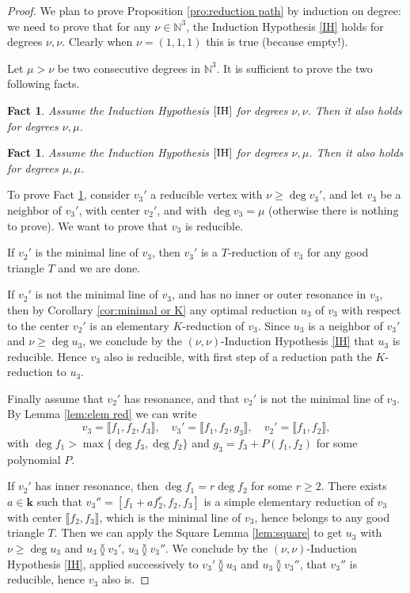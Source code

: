 \documentclass[reqno,oneside,11pt]{amsart}
\theoremstyle{plain}
\newtheorem{fact}[theorem]{Fact}
\theoremstyle{definition}
\newcommand{\N}{\mathbb{N}}
\newcommand{\K}{\mathbf{k}}
\renewcommand{\ne}{\between}
\newcommand{\llb}{\llbracket}
\newcommand{\rrb}{\rrbracket}
\renewcommand{\ge}{\geqslant}
\begin{document}
\begin{proof}
We plan to prove Proposition \ref{pro:reduction path} by induction on degree: we need to prove that for any $\nu \in \N^3$, the Induction Hypothesis \ref{IH} holds for degrees $\nu,\nu$.
Clearly when $\nu =(1,1,1)$ this is true (because empty!).

Let $\mu > \nu$ be two consecutive degrees in $\N^3$.
It is sufficient to prove the two following facts.

\begin{fact} \label{fact:induction 1}
Assume the Induction Hypothesis $\ref{IH}$ for degrees $\nu,\nu$.
Then it also holds for degrees $\nu,\mu$.
\end{fact}

\begin{fact} \label{fact:induction 2}
Assume the Induction Hypothesis $\ref{IH}$ for degrees $\nu,\mu$.
Then it also holds for degrees $\mu,\mu$.
\end{fact}

To prove Fact \ref{fact:induction 1}, consider $v_3'$ a reducible vertex with $\nu \ge \deg v_3'$, and let $v_3$ be a neighbor of $v_3'$, with center $v_2'$, and with $\deg v_3 = \mu$ (otherwise there is nothing to prove).
We want to prove that $v_3$ is reducible.

If $v_2'$ is the minimal line of $v_3$, then $v_3'$ is a $T$-reduction of $v_3$ for any good triangle $T$ and we are done.

If $v_2'$ is not the minimal line of $v_3$, and has no inner or outer resonance in $v_3$, then by Corollary \ref{cor:minimal or K} any optimal reduction $u_3$ of $v_3$ with respect to the center $v_2'$ is an elementary $K$-reduction of $v_3$.
Since $u_3$ is a neighbor of $v_3'$ and $\nu \ge \deg u_3$, we conclude by the $(\nu,\nu)$-Induction Hypothesis \ref{IH} that $u_3$ is reducible.
Hence $v_3$ also is reducible, with first step of a reduction path the $K$-reduction to $u_3$.

Finally assume that $v_2'$ has resonance, and that $v_2'$ is not the minimal line of $v_3$.
By Lemma \ref{lem:elem red} we can write
$$v_3 = \llb f_1, f_2, f_3 \rrb, \quad v_3' = \llb f_1, f_2, g_3 \rrb, \quad v_2' = \llb f_1, f_2 \rrb,$$
with $\deg f_1 > \max \{\deg f_3,\deg f_2 \}$ and $g_3 = f_3 + P(f_1, f_2)$ for some polynomial $P$.

If $v_2'$ has inner resonance, then $\deg f_1 = r \deg f_2$ for some $r \ge 2$.
There exists $a \in \K$ such that $v_3'' = [f_1 + af_2^r, f_2, f_3]$ is a simple elementary reduction of $v_3$ with center $\llb f_2, f_3 \rrb$, which is the minimal line of $v_3$, hence belongs to any good triangle $T$.
Then we can apply the Square Lemma \ref{lem:square} to get $u_3$ with $\nu \ge \deg u_3$ and $u_3 \ne v_3'$, $u_3 \ne v_3''$.
We conclude by the $(\nu,\nu)$-Induction Hypothesis \ref{IH}, applied successively to $v_3' \ne u_3$ and $u_3 \ne v_3''$, that $v_3''$ is reducible, hence $v_3$ also is.


\end{proof}
\end{document}
